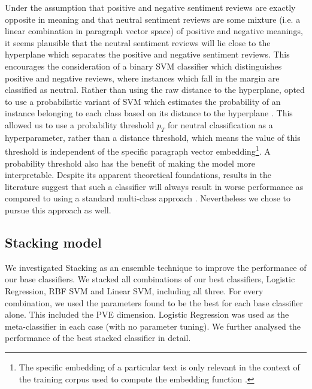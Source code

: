 \documentclass[11pt]{article}
\newcommand{\drafting}[1]{\textcolor{OliveGreen}{#1}}
\begin{document}
Under the assumption that positive and negative sentiment reviews are exactly opposite in meaning and that neutral sentiment reviews are some mixture (i.e. a linear combination in paragraph vector space) of positive and negative meanings, it seems plausible that the neutral sentiment reviews will lie close to the hyperplane which separates the positive and negative sentiment reviews. This encourages the consideration of a binary SVM classifier which distinguishes positive and negative reviews, where instances which fall in the margin are classified as neutral. Rather than using the raw distance to the hyperplane, opted to use a probabilistic variant of SVM which estimates the probability of an instance belonging to each class based on its distance to the hyperplane \cite{platt_probabilistic_1999}. This allowed us to use a probability threshold $p_T$ for neutral classification as a hyperparameter, rather than a distance threshold, which means the value of this threshold is independent of the specific paragraph vector embedding\footnote{The specific embedding of a particular text is only relevant in the context of the training corpus used to compute the embedding function \cite{le_distributed_2014}.}. A probability threshold also has the benefit of making the model more interpretable. Despite its apparent theoretical foundations, results in the literature suggest that such a classifier will always result in worse performance as compared to using a standard multi-class approach \cite{koppel_importance_2006}. Nevertheless we chose to pursue this approach as well.


\subsection{Stacking model}
\drafting{
We investigated Stacking as an ensemble technique to improve the performance of our base classifiers. We stacked all combinations of our best classifiers, Logistic Regression, RBF SVM and Linear SVM, including all three. For every combination, we used the parameters found to be the best for each base classifier alone. This included the PVE dimension. Logistic Regression was used as the meta-classifier in each case (with no parameter tuning).
We further analysed the performance of the best stacked classifier in detail.
}
\end{document}
